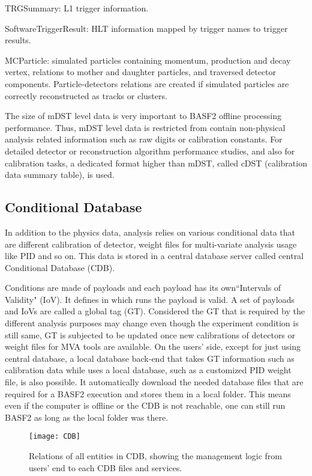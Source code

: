 \textbullet \space TRGSummary: L1 trigger information. 
 
\textbullet \space SoftwareTriggerResult: HLT information mapped by trigger names to trigger results. 

\textbullet \space  MCParticle: simulated particles containing 
momentum, production and decay vertex, relations
to mother and daughter particles, and traversed detector components. Particle-detectors relations are
created if simulated particles are correctly reconstructed as
tracks or clusters.

The size of mDST level data is very important to BASF2 offline processing performance. Thus, mDST level data is restricted from contain non-physical analysis related information such as raw digits or calibration constants. For detailed detector
or reconstruction algorithm performance studies, and also for calibration tasks, a dedicated format higher than mDST, called cDST 
(calibration data summary table), is used.
 

\subsection{Conditional Database}

In addition to the physics data, analysis relies on various conditional data that are different calibration of detector, weight files for multi-variate analysis usage like PID and so on. This data is stored in a central database server called central Conditional Database (CDB). 

Conditions are made of payloads and each payload has its own``Intervals of Validity" (IoV). It defines in which runs the payload is valid. A set of payloads and IoVs are called a global tag (GT). Considered the GT that is required by the different analysis purposes may change even though the experiment condition is still same, GT is subjected to be updated once new calibrations of detectors or weight files for MVA tools are available. On the users' side, except for just using central database, a local database back-end that takes GT information such as calibration data while uses a local database, such as a customized PID weight file,  is also possible.  It automatically download the needed database files that are required for a BASF2 execution and stores them in a local folder. This means even if the computer is offline or the CDB is not reachable, one can still run BASF2 as long as the local folder was there. 

\begin{figure}[htbp]
	\centering
	\texttt{[image: CDB]}
	\caption{ Relations of all entities in CDB\cite{BASF2}, showing the management logic from users' end to each CDB files and services. }
	\label{fig:CDB}
\end{figure}

